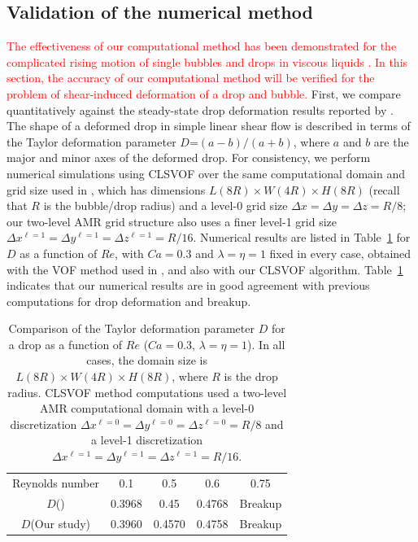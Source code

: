\documentclass{elsarticle}
\newcommand{\lwh}[3]{L(#1R)\times W(#2R) \times H(#3R)}
\begin{document}
\subsection{Validation of the numerical method}
\textcolor{red}
{
The effectiveness of our computational method has been demonstrated for the complicated rising motion of 
single bubbles and drops in viscous liquids \citet{OhtSus12, OhtAkaYosSus14, OhtFurYosSus19} .
In this section, the accuracy of our computational method will be verified for the problem of shear-induced 
deformation of a drop and bubble. 
}
First, we compare quantitatively against the steady-state drop
deformation results reported by \citet{LiRenRen00}.  The shape of a
deformed drop in simple linear shear flow is described in terms of the Taylor
deformation parameter $D$=$(a-b)/(a+b)$, 
where $a$ and $b$ are the major and minor axes of the deformed drop.  
For consistency, we perform numerical simulations using CLSVOF over the same
computational domain and grid size used in \citet{LiRenRen00}, which has dimensions 
$\lwh{8}{4}{8}$ (recall that $R$ is
the bubble/drop radius) and a level-0 grid size $\Delta x=\Delta y=\Delta
z=R/8$; our two-level AMR grid structure also uses a finer level-1 grid size
$\Delta x^{\ell=1} = \Delta y^{\ell=1} = \Delta z^{\ell=1} = R/16$.  Numerical
results are listed in Table~\ref{tab:DeComparison} for $D$ 
as a function of $Re$, with $Ca=0.3$ and $\lambda = \eta = 1$ fixed in every case, obtained with
the VOF method used in \citet{LiRenRen00}, and also with our CLSVOF algorithm.
Table~\ref{tab:DeComparison} indicates that our numerical results are in good
agreement with previous computations for drop deformation and breakup.
%
\begin{table}[tbh]
\caption{Comparison of the Taylor deformation parameter $D$ for a drop as a function 
         of $Re$ ($Ca=0.3$, $\lambda = \eta = 1$). In all cases, the domain 
         size is $\lwh{8}{4}{8}$, where $R$ is the drop radius.
         CLSVOF method computations used a two-level AMR computational domain 
         with a level-0 discretization $\Delta x^{\ell=0} = \Delta y^{\ell=0} 
         = \Delta z^{\ell=0} = R/8$ and a level-1 discretization
         $\Delta x^{\ell=1} = \Delta y^{\ell=1} = \Delta z^{\ell=1} = R/16$.}
\label{tab:DeComparison}
\center
\begin{tabular}{ c  c  c  c  c }
\hline
\hline
Reynolds number                      & 0.1     & 0.5     & 0.6     & 0.75      \\
$D$(\citet{LiRenRen00})  & 0.3968  & 0.45    & 0.4768  & Breakup   \\
$D$(Our study) & 0.3960  & 0.4570  & 0.4758  & Breakup   \\
\hline
\hline
\end{tabular}
\end{table}
\end{document}
